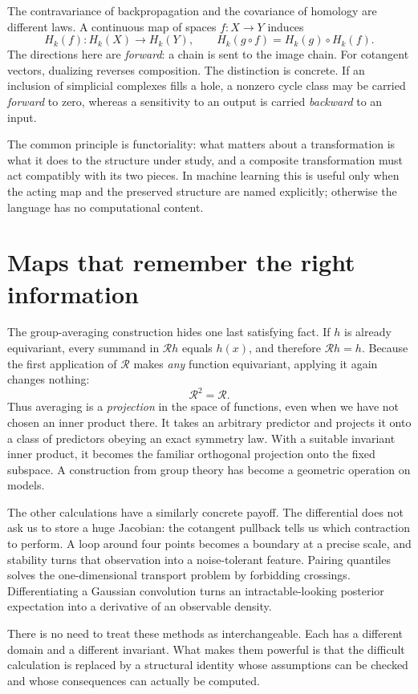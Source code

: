 The contravariance of backpropagation and the covariance of homology are different laws. A continuous map of spaces $f:X\to Y$ induces
\[
 H_k(f):H_k(X)\to H_k(Y),
 \qquad H_k(g\circ f)=H_k(g)\circ H_k(f).
\]
The directions here are \emph{forward}: a chain is sent to the image chain. For cotangent vectors, dualizing reverses composition. The distinction is concrete. If an inclusion of simplicial complexes fills a hole, a nonzero cycle class may be carried \emph{forward} to zero, whereas a sensitivity to an output is carried \emph{backward} to an input.

The common principle is functoriality: what matters about a transformation is what it does to the structure under study, and a composite transformation must act compatibly with its two pieces. In machine learning this is useful only when the acting map and the preserved structure are named explicitly; otherwise the language has no computational content.

\section{Maps that remember the right information}

The group-averaging construction hides one last satisfying fact. If $h$ is already equivariant, every summand in $\mathcal Rh$ equals $h(x)$, and therefore $\mathcal Rh=h$. Because the first application of $\mathcal R$ makes \emph{any} function equivariant, applying it again changes nothing:
\[
 \boxed{\mathcal R^2=\mathcal R.}
\]
Thus averaging is a \emph{projection} in the space of functions, even when we have not chosen an inner product there. It takes an arbitrary predictor and projects it onto a class of predictors obeying an exact symmetry law. With a suitable invariant inner product, it becomes the familiar orthogonal projection onto the fixed subspace. A construction from group theory has become a geometric operation on models.

The other calculations have a similarly concrete payoff. The differential does not ask us to store a huge Jacobian: the cotangent pullback tells us which contraction to perform. A loop around four points becomes a boundary at a precise scale, and stability turns that observation into a noise-tolerant feature. Pairing quantiles solves the one-dimensional transport problem by forbidding crossings. Differentiating a Gaussian convolution turns an intractable-looking posterior expectation into a derivative of an observable density.

There is no need to treat these methods as interchangeable. Each has a different domain and a different invariant. What makes them powerful is that the difficult calculation is replaced by a structural identity whose assumptions can be checked and whose consequences can actually be computed.
